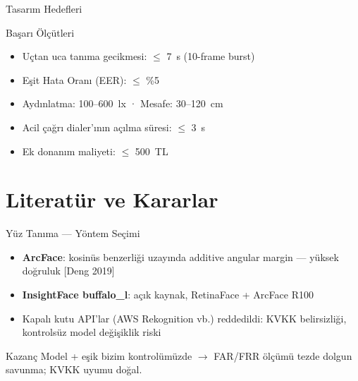 \documentclass[aspectratio=169,12pt]{beamer}
\begin{document}
\begin{frame}{Tasarım Hedefleri}
    \begin{block}{Başarı Ölçütleri}
        \begin{itemize}
            \item Uçtan uca tanıma gecikmesi: $\leq$ 7~s (10-frame burst)
            \item Eşit Hata Oranı (EER): $\leq$ \%5
            \item Aydınlatma: 100--600~lx · Mesafe: 30--120~cm
            \item Acil çağrı dialer'ının açılma süresi: $\leq$ 3~s
            \item Ek donanım maliyeti: $\leq$ 500~TL
        \end{itemize}
    \end{block}
\end{frame}

\section{Literatür ve Kararlar}

\begin{frame}{Yüz Tanıma --- Yöntem Seçimi}
    \begin{itemize}
        \item \textbf{ArcFace}: kosinüs benzerliği uzayında additive angular
              margin --- yüksek doğruluk \alert{[Deng 2019]}
        \item \textbf{InsightFace buffalo\_l}: açık kaynak, RetinaFace +
              ArcFace R100
        \item Kapalı kutu API'lar (AWS Rekognition vb.) reddedildi:
              KVKK belirsizliği, kontrolsüz model değişiklik riski
    \end{itemize}

    \vspace{0.3cm}
    \begin{exampleblock}{Kazanç}
        Model + eşik bizim kontrolümüzde $\rightarrow$ FAR/FRR ölçümü
        tezde dolgun savunma; KVKK uyumu doğal.
    \end{exampleblock}
\end{frame}
\end{document}
